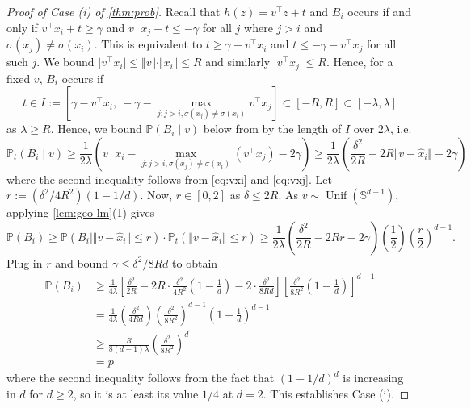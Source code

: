 \documentclass[aoap]{imsart}
\numberwithin{equation}{section}
\theoremstyle{definition}
\theoremstyle{remark}
\renewcommand{\hat}{\widehat}
\numberwithin{equation}{section}
\renewcommand{\S}{\mathbb{S}}
\newcommand{\0}{\mathbf{0}}
\newcommand{\1}{\mathbf{1}}
\renewcommand{\P}{\mathbb{P}}
\renewcommand{\S}{\mathbb{S}}
\DeclareMathOperator{\Unif}{Unif}
\numberwithin{equation}{section}
\begin{document}
\begin{proof}[Proof of Case (i) of \cref{thm:prob}]
Recall that $h(z)=v^{\intercal}z+t$ and $B_i$ occurs if and only if $v^{\intercal}x_i+t\geq \gamma$ and $v^{\intercal}x_j+t\leq-\gamma$ for all $j$ where $j>i$ and $\sigma (x_j)\neq\sigma (x_i)$. This is equivalent to $t\geq \gamma-v^{\intercal}x_i$ and $t\leq -\gamma-v^{\intercal}x_j$ for all such $j$. We bound $\vert v^{\intercal}x_i\vert \leq \Vert v\Vert \cdot\Vert x_i\Vert \leq R$ and similarly $\vert v^{\intercal}x_{j}\vert \leq R$. Hence, for a fixed $v$, $B_i$ occurs if
\[ t\in I:=\left[\gamma - v^{\intercal}x_i, \  -\gamma - \max_{j:j>i, \sigma(x_j)\neq\sigma(x_i)}v^{\intercal}x_j\right] \subset [-R, R]\subset [-\lambda, \lambda] \]
as $\lambda\geq R$. Hence, we bound $\P(B_i\mid v)$ below from by the length of $I$ over $2\lambda$, i.e.
\[ \P_{t}\left(B_{i}\mid v\right) \geq \frac{1}{2\lambda}\left(v^{\intercal}x_{i}-\max_{j:j>i, \sigma(x_j)\neq \sigma(x_i)}( v^{\intercal}x_{j}) -2\gamma\right)\geq \frac{1}{2\lambda}\left(\frac{\delta^{2}}{2 R}-2R\Vert v-\hat{x}_{i}\Vert -2\gamma\right)\]
where the second inequality follows from \eqref{eq:vxi} and \eqref{eq:vxj}. Let $r:=\left({\delta^{2}}/{4R^{2}}\right)\left(1-{1}/{d}\right)$. Now, $r\in [0,2]$ as $\delta \leq 2R$. As $v\sim \Unif(\S^{d-1})$, applying \cref{lem:geo lm}(1) gives
\[
\P(B_{i}) \geq \P\left(B_{i}\mid \Vert v-\hat{x}_{i}\Vert \leq r\right)\cdot \P_{t}\left(\Vert v-\hat{x}_{i}\Vert \leq r\right)
\geq \frac{1}{2\lambda}\left(\frac{\delta^{2}}{2R}-2Rr-2\gamma\right)\left(\frac{1}{2}\right)\left(\frac{r}{2}\right)^{d-1}.
\]
Plug in $r$ and bound $\gamma \leq \delta^{2}/8Rd$ to obtain
\begin{align*}
\P(B_{i}) & \geq \frac{1}{4\lambda}\left[\frac{\delta^{2}}{2R}-2R\cdot \frac{\delta^{2}}{4R^{2}}\left(1-\frac{1}{d}\right)-2\cdot \frac{\delta^{2}}{8Rd} \right]\left[\frac{\delta^{2}}{8R^{2}}\left(1-\frac{1}{d}\right)\right]^{d-1}
\\ &  = \frac{1}{4\lambda}\left(\frac{\delta^{2}}{4Rd}\right)\left(\frac{\delta^{2}}{8R^{2}}\right)^{d-1}\left(1-\frac{1}{d}\right)^{d-1} 
\\ & \geq \frac{R}{8(d-1)\lambda}\left(\frac{\delta^{2}}{8R^{2}}\right)^{d}
\\ & = p
\end{align*}
where the second inequality follows from the fact that $(1-1/d)^d$ is increasing in $d$ for $d\geq 2$, so it is at least its value $1/4$ at $d=2$. This establishes Case (i).
\end{proof} 
\end{document}
